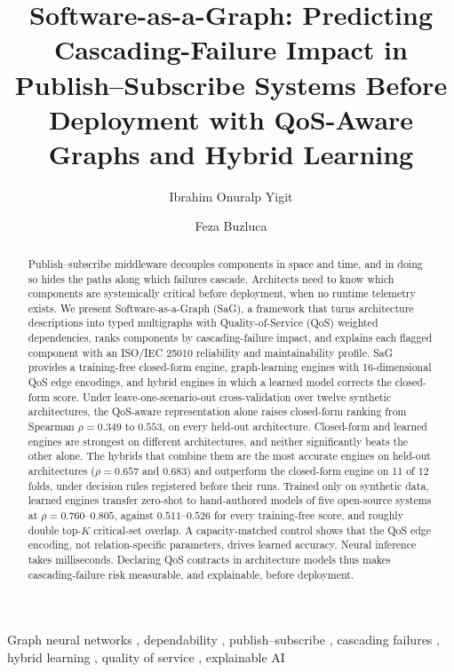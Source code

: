 \documentclass[preprint,3p]{elsarticle}
\begin{document}
\begin{frontmatter}

\title{Software-as-a-Graph: Predicting Cascading-Failure Impact in
  Publish--Subscribe Systems Before Deployment with QoS-Aware Graphs
  and Hybrid Learning}

\author[itu]{Ibrahim Onuralp Yigit}
\author[itu]{Feza Buzluca}


\begin{abstract}
Publish--subscribe middleware decouples components in space and time, and in doing so hides the paths along which failures cascade. Architects need to know which components are systemically critical before deployment, when no runtime telemetry exists. We present Software-as-a-Graph (SaG), a framework that turns architecture descriptions into typed multigraphs with Quality-of-Service (QoS) weighted dependencies, ranks components by cascading-failure impact, and explains each flagged component with an ISO/IEC 25010 reliability and maintainability profile. SaG provides a training-free closed-form engine, graph-learning engines with 16-dimensional QoS edge encodings, and hybrid engines in which a learned model corrects the closed-form score. Under leave-one-scenario-out cross-validation over twelve synthetic architectures, the QoS-aware representation alone raises closed-form ranking from Spearman $\rho = 0.349$ to $0.553$, on every held-out architecture. Closed-form and learned engines are strongest on different architectures, and neither significantly beats the other alone. The hybrids that combine them are the most accurate engines on held-out architectures ($\rho = 0.657$ and $0.683$) and outperform the closed-form engine on 11 of 12 folds, under decision rules registered before their runs. Trained only on synthetic data, learned engines transfer zero-shot to hand-authored models of five open-source systems at $\rho = 0.760$--$0.805$, against $0.511$--$0.526$ for every training-free score, and roughly double top-$K$ critical-set overlap. A capacity-matched control shows that the QoS edge encoding, not relation-specific parameters, drives learned accuracy. Neural inference takes milliseconds. Declaring QoS contracts in architecture models thus makes cascading-failure risk measurable, and explainable, before deployment.

\end{abstract}

\begin{keyword}
Graph neural networks \sep
dependability \sep
publish--subscribe \sep
cascading failures \sep
hybrid learning \sep
quality of service \sep
explainable AI
\end{keyword}

\end{frontmatter}
\end{document}
